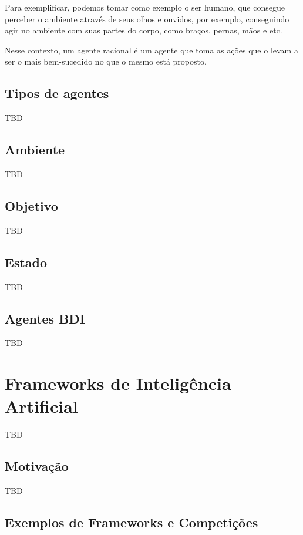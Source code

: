 Para exemplificar, podemos tomar como exemplo o ser humano, que consegue
perceber o ambiente através de seus olhos e ouvidos, por exemplo, conseguindo
agir no ambiente com suas partes do corpo, como braços, pernas, mãos e etc.
\cite{Russell:1995:AIM:193191}

Nesse contexto, um agente racional é um agente que toma as ações que o levam a
ser o mais bem-sucedido no que o mesmo está proposto.

\subsection{Tipos de agentes}

TBD

\subsection{Ambiente}

TBD

\subsection{Objetivo}

TBD

\subsection{Estado}

TBD

\subsection{Agentes BDI}

TBD

\section{Frameworks de Inteligência Artificial}

TBD

\subsection{Motivação}

TBD

\subsection{Exemplos de Frameworks e Competições}

